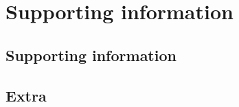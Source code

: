 \chapter{Supporting information}
\label{app:Support}
\section{Supporting information}
\label{sec:appSupport-support}
\lipsum[1-2]

\section{Extra}
\label{sec:appSupport-extra}
\lipsum[1-2]